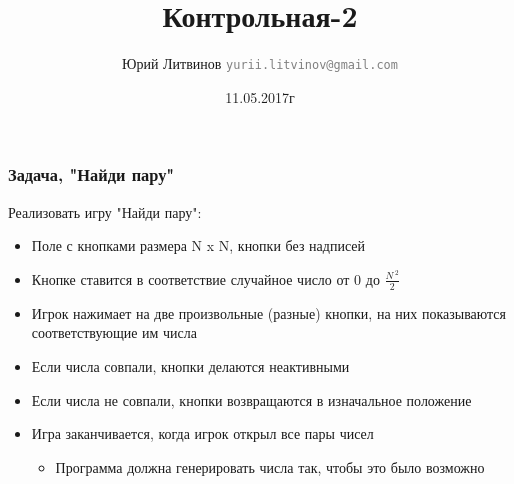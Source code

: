 \documentclass[xetex,mathserif,serif]{beamer}
\title{Контрольная-2}
\author[Юрий Литвинов]{Юрий Литвинов \newline \textcolor{gray}{\small\texttt{yurii.litvinov@gmail.com}}}
\date{11.05.2017г}
\begin{document}
	
	\frame{\titlepage}
	
	\begin{frame}
		\frametitle{Задача, "Найди пару"}
		Реализовать игру "Найди пару":
		\begin{itemize}
			\item Поле с кнопками размера N x N, кнопки без надписей
			\item Кнопке ставится в соответствие случайное число от 0 до $\frac{N ^{\ 2}}{2}$
			\item Игрок нажимает на две произвольные (разные) кнопки, на них показываются соответствующие им числа 
			\item Если числа совпали, кнопки делаются неактивными
			\item Если числа не совпали, кнопки возвращаются в изначальное положение
			\item Игра заканчивается, когда игрок открыл все пары чисел
			\begin{itemize}
				\item Программа должна генерировать числа так, чтобы это было возможно
			\end{itemize}
		\end{itemize}
	\end{frame}
\end{document}
